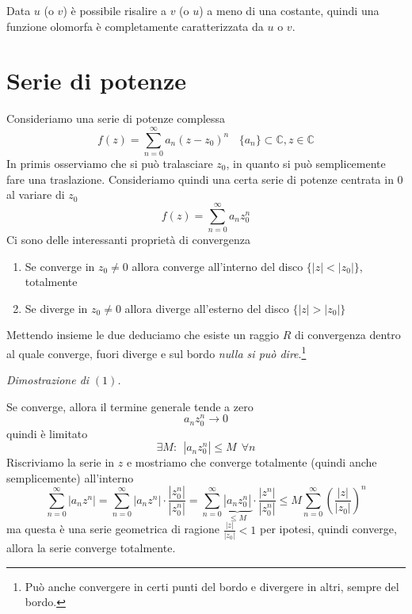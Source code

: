 Data $u$ (o $v$) è possibile risalire a $v$ (o $u$) a meno di una costante, quindi una funzione olomorfa è completamente caratterizzata da $u$ o $v$.
\section{Serie di potenze}

Consideriamo una serie di potenze complessa
\begin{equation*}
f( z) =\sum\limits ^{\infty }_{n=0} a_{n}( z-z_{0})^{n} \ \ \ \ \{a_{n}\} \subset \mathbb{C} ,z\in \mathbb{C}
\end{equation*}
In primis osserviamo che si può tralasciare $z_{0}$, in quanto si può semplicemente fare una traslazione. Consideriamo quindi una certa serie di potenze centrata in $0$ al variare di $z_{0}$
\begin{equation*}
f( z) =\sum\limits ^{\infty }_{n=0} a_{n} z^{n}_{0}
\end{equation*}
Ci sono delle interessanti proprietà di convergenza
\begin{enumerate}
\item Se converge in $z_{0} \neq 0$ allora converge all'interno del disco $\{| z| < | z_{0}| \}$, totalmente
\item Se diverge in $z_{0} \neq 0$ allora diverge all'esterno del disco $\{| z|  >| z_{0}| \}$
\end{enumerate}

Mettendo insieme le due deduciamo che esiste un raggio $R$ di convergenza dentro al quale converge, fuori diverge e sul bordo \textit{nulla si può dire}.\footnote{Può anche convergere in certi punti del bordo e divergere in altri, sempre del bordo.}



\textit{Dimostrazione di }$( 1)$\textit{.}

Se converge, allora il termine generale tende a zero
\begin{equation*}
a_{n} z^{n}_{0}\rightarrow 0
\end{equation*}
quindi è limitato
\begin{equation*}
\exists M:\ \ \left| a_{n} z^{n}_{0}\right| \leqslant M\ \ \forall n
\end{equation*}
Riscriviamo la serie in $z$ e mostriamo che converge totalmente (quindi anche semplicemente) all'interno
\begin{equation*}
\sum\limits ^{\infty }_{n=0}\left| a_{n} z^{n}\right| =\sum\limits ^{\infty }_{n=0}\left| a_{n} z^{n}\right| \cdotp \frac{\left| z^{n}_{0}\right| }{\left| z^{n}_{0}\right| } =\sum\limits ^{\infty }_{n=0}\underbrace{\left| a_{n} z^{n}_{0}\right| }_{\leqslant M} \cdotp \frac{\left| z^{n}\right| }{\left| z^{n}_{0}\right| } \leqslant M\sum\limits ^{\infty }_{n=0}\left(\frac{| z| }{| z_{0}| }\right)^{n}
\end{equation*}
ma questa è una serie geometrica di ragione $\frac{| z| }{| z_{0}| } < 1$ per ipotesi, quindi converge, allora la serie converge totalmente.

